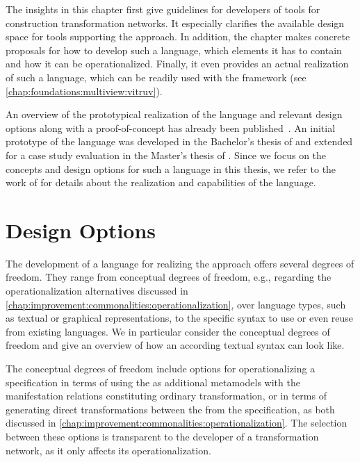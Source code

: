
The insights in this chapter first give guidelines for developers of tools for construction transformation networks.
It especially clarifies the available design space for tools supporting the \commonalities approach.
In addition, the chapter makes concrete proposals for how to develop such a language, which elements it has to contain and how it can be operationalized.
Finally, it even provides an actual realization of such a language, which can be readily used with the \vitruv framework (see \autoref{chap:foundations:multiview:vitruv}).

An overview of the prototypical realization of the \commonalities language and relevant design options along with a proof-of-concept has already been published~.
An initial prototype of the language was developed in the Bachelor's thesis of  and extended for a case study evaluation in the Master's thesis of .
Since we focus on the concepts and design options for such a language in this thesis, we refer to the work of  for details about the realization and capabilities of the \commonalities language.



\section{Design Options}

The development of a language for realizing the \commonalities approach offers several degrees of freedom.
They range from conceptual degrees of freedom, e.g., regarding the operationalization alternatives discussed in \autoref{chap:improvement:commonalities:operationalization}, over language types, such as textual or graphical representations, to the specific syntax to use or even reuse from existing languages.
We in particular consider the conceptual degrees of freedom and give an overview of how an according textual syntax can look like.

The conceptual degrees of freedom include options for operationalizing a specification in terms of using the \conceptmetamodels as additional metamodels with the manifestation relations constituting ordinary transformation, or in terms of generating direct transformations between the \concretemetamodels from the \commonalities specification, as both discussed in \autoref{chap:improvement:commonalities:operationalization}.
The selection between these options is transparent to the developer of a transformation network, as it only affects its operationalization.

